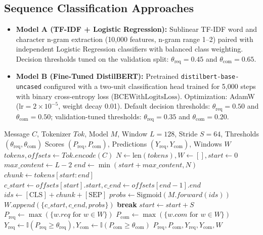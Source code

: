 \documentclass[conference]{IEEEtran}
\begin{document}
\subsection{Sequence Classification Approaches}
\begin{itemize}
    \item \textbf{Model A (TF-IDF + Logistic Regression):} Sublinear TF-IDF word and character n-gram extraction (10,000 features, n-gram range 1--2) paired with independent Logistic Regression classifiers with balanced class weighting. Decision thresholds tuned on the validation split: $\theta_{\text{req}} = 0.45$ and $\theta_{\text{com}} = 0.65$.
    \item \textbf{Model B (Fine-Tuned DistilBERT):} Pretrained \texttt{distilbert-base-uncased} configured with a two-unit classification head trained for 5,000 steps with binary cross-entropy loss ($\text{BCEWithLogitsLoss}$). Optimization: AdamW ($\text{lr} = 2 \times 10^{-5}$, weight decay 0.01). Default decision thresholds: $\theta_{\text{req}} = 0.50$ and $\theta_{\text{com}} = 0.50$; validation-tuned thresholds: $\theta_{\text{req}} = 0.35$ and $\theta_{\text{com}} = 0.20$.
\end{itemize}

\begin{algorithm}[htbp]
\caption{Overlapping Sliding-Window Inference}
\label{alg:sliding}
\begin{algorithmic}[1]
\REQUIRE Message $C$, Tokenizer $Tok$, Model $M$, Window $L=128$, Stride $S=64$, Thresholds $(\theta_{\text{req}}, \theta_{\text{com}})$
\ENSURE Scores $(P_{\text{req}}, P_{\text{com}})$, Predictions $(Y_{\text{req}}, Y_{\text{com}})$, Windows $W$
\STATE $tokens, offsets \leftarrow Tok.encode(C)$
\STATE $N \leftarrow \text{len}(tokens), W \leftarrow [], start \leftarrow 0$
\STATE $max\_content \leftarrow L - 2$
    \STATE $end \leftarrow \min(start + max\_content, N)$
    \STATE $chunk \leftarrow tokens[start:end]$
    \STATE $c\_start \leftarrow offsets[start].start, c\_end \leftarrow offsets[end-1].end$
    \STATE $ids \leftarrow [\text{CLS}] + chunk + [\text{SEP}]$
    \STATE $probs \leftarrow \text{Sigmoid}(M.forward(ids))$
    \STATE $W.append(\{c\_start, c\_end, probs\})$
     \STATE \textbf{break} \ENDIF
    \STATE $start \leftarrow start + S$
\ENDWHILE
\STATE $P_{\text{req}} \leftarrow \max(\{w.req \text{ for } w \in W\})$
\STATE $P_{\text{com}} \leftarrow \max(\{w.com \text{ for } w \in W\})$
\STATE $Y_{\text{req}} \leftarrow \mathbb{I}(P_{\text{req}} \ge \theta_{\text{req}}), Y_{\text{com}} \leftarrow \mathbb{I}(P_{\text{com}} \ge \theta_{\text{com}})$
\RETURN $P_{\text{req}}, P_{\text{com}}, Y_{\text{req}}, Y_{\text{com}}, W$
\end{algorithmic}
\end{algorithm}
\end{document}
